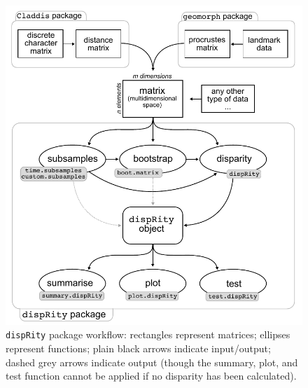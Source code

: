 \documentclass[12pt,letterpaper]{article}
\newcommand{\disp}{\texttt{dispRity} }
\begin{document}
\begin{figure}[!htbp]
\centering
   \includegraphics[width=1\textwidth]{workflowsvg.pdf} 
\caption{\disp package workflow: rectangles represent matrices; ellipses represent functions; plain black arrows indicate input/output; dashed grey arrows indicate output (though the summary, plot, and test function cannot be applied if no disparity has been calculated).}
\label{Fig:workflow}
\end{figure}
\end{document}
